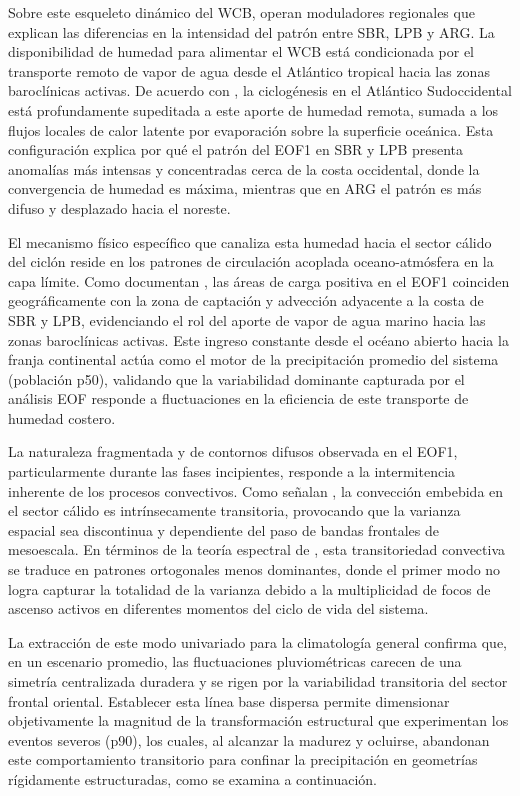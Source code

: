 Sobre este esqueleto dinámico del WCB, operan moduladores regionales que explican las diferencias en la intensidad del patrón entre SBR, LPB y ARG. La disponibilidad de humedad para alimentar el WCB está condicionada por el transporte remoto de vapor de agua desde el Atlántico tropical hacia las zonas baroclínicas activas. De acuerdo con \citet{gozzo2017climatology}, la ciclogénesis en el Atlántico Sudoccidental está profundamente supeditada a este aporte de humedad remota, sumada a los flujos locales de calor latente por evaporación sobre la superficie oceánica. Esta configuración explica por qué el patrón del EOF1 en SBR y LPB presenta anomalías más intensas y concentradas cerca de la costa occidental, donde la convergencia de humedad es máxima, mientras que en ARG el patrón es más difuso y desplazado hacia el noreste.

El mecanismo físico específico que canaliza esta humedad hacia el sector cálido del ciclón reside en los patrones de circulación acoplada oceano-atmósfera en la capa límite. Como documentan \citet{rocha2016estudo}, las áreas de carga positiva en el EOF1 coinciden geográficamente con la zona de captación y advección adyacente a la costa de SBR y LPB, evidenciando el rol del aporte de vapor de agua marino hacia las zonas baroclínicas activas. Este ingreso constante desde el océano abierto hacia la franja continental actúa como el motor de la precipitación promedio del sistema (población p50), validando que la variabilidad dominante capturada por el análisis EOF responde a fluctuaciones en la eficiencia de este transporte de humedad costero.

La naturaleza fragmentada y de contornos difusos observada en el EOF1, particularmente durante las fases incipientes, responde a la intermitencia inherente de los procesos convectivos. Como señalan \citet{naud2020evaluation}, la convección embebida en el sector cálido es intrínsecamente transitoria, provocando que la varianza espacial sea discontinua y dependiente del paso de bandas frontales de mesoescala. En términos de la teoría espectral de \citet{hannachi2007empirical}, esta transitoriedad convectiva se traduce en patrones ortogonales menos dominantes, donde el primer modo no logra capturar la totalidad de la varianza debido a la multiplicidad de focos de ascenso activos en diferentes momentos del ciclo de vida del sistema.

La extracción de este modo univariado para la climatología general confirma que, en un escenario promedio, las fluctuaciones pluviométricas carecen de una simetría centralizada duradera y se rigen por la variabilidad transitoria del sector frontal oriental. Establecer esta línea base dispersa permite dimensionar objetivamente la magnitud de la transformación estructural que experimentan los eventos severos (p90), los cuales, al alcanzar la madurez y ocluirse, abandonan este comportamiento transitorio para confinar la precipitación en geometrías rígidamente estructuradas, como se examina a continuación.

